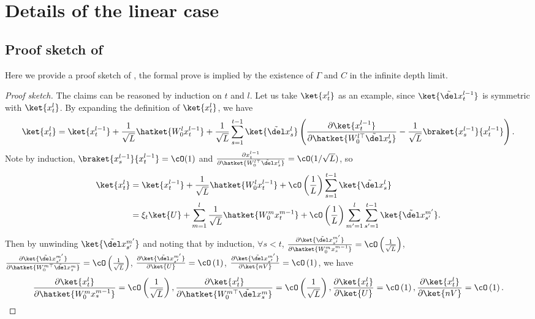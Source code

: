 
    
    
    

\section{Details of the linear case}\label{app:proof_linear}

\subsection{Proof sketch of }
Here we provide a proof sketch of , the formal prove is implied by the existence of $\Gamma$ and $C$ in the infinite depth limit.
\begin{proof}[Proof sketch]
The claims can be reasoned by induction on $t$ and $l$. Let us take $\ket{x_t^l}$ as an example, since $\ket{\tilde \del x_t^{l-1}}$ is symmetric with $\ket{x_t^l}$. 
By expanding the definition of $\ket{x_t^l}$, we have 
\[\ket{x_t^l} = \ket{x_t^{l-1}} + \frac1{\sqrt L} \hatket{W_0^l x_t^{l-1}} + \frac1{\sqrt L} \sum_{s=1}^{t-1} \ket{\tilde \del x_s^{l}} \left(\frac{\partial \ket{x_t^{l-1}}}{\partial \hatket{W_0^{l\top} \tilde \del x_s^{l}}} - \frac1{\sqrt L} \braket{x_s^{l-1}}{x_t^{l-1}} \right).\]
Note by induction, $\braket{x_s^{l-1}}{x_t^{l-1}}=\cO(1)$ and $\frac{\partial x_t^{l-1}}{\partial \hatket{W_0^{l\top} \tilde \del x_s^{l}}}=\cO(1/\sqrt L)$,
so
\begin{align*}
    \ket{x_t^l} & = \ket{x_t^{l-1}} + \frac1{\sqrt L} \hatket{W_0^l x_t^{l-1}} + \cO\left(\frac1L\right)\sum_{s=1}^{t-1} \ket{\tilde \del x_s^{l}} \\
    & = \xi_t \ket{U} + \sum_{m=1}^l \frac1{\sqrt L} \hatket{W_0^m x_t^{m-1}}+\cO\left(\frac1L\right)\sum_{m'=1}^l\sum_{s'=1}^{t-1}\ket{\tilde \del x_{s'}^{m'}}.
\end{align*}
Then by unwinding $\ket{\tilde \del x_{s'}^{m'}}$ and noting that by induction, $\forall s <t$, $
    \frac{\partial \ket{\tilde \del x_{s'}^{m'}}}{\partial \hatket{W_0^mx_s^{m-1}}} = \cO\left(\frac1{\sqrt L}\right)$,
    $\frac{\partial \ket{\tilde \del x_{s'}^{m'}}}{\partial \hatket{W_0^{m\top}\tilde \del x_s^m}} = \cO\left(\frac1{\sqrt L}\right)$,
    $\frac{\partial \ket{\tilde \del x_{s'}^{m'}}}{\partial \ket{U}} = \cO\left(1\right)$,
    $\frac{\partial \ket{\tilde \del x_{s'}^{m'}}}{\partial \ket{nV}} = \cO\left(1\right)$,
we have 
\[\frac{\partial \ket{x_t^l}}{\partial \hatket{W_0^mx_s^{m-1}}} = \cO\left(\frac1{\sqrt L}\right),
     \frac{\partial \ket{x_t^l}}{\partial \hatket{W_0^{m\top}\tilde \del x_s^m}} = \cO\left(\frac1{\sqrt L}\right),
     \frac{\partial \ket{x_t^l}}{\partial \ket{U}} = \cO\left(1\right),
     \frac{\partial \ket{x_t^l}}{\partial \ket{nV}} = \cO\left(1\right).\]


\end{proof}

